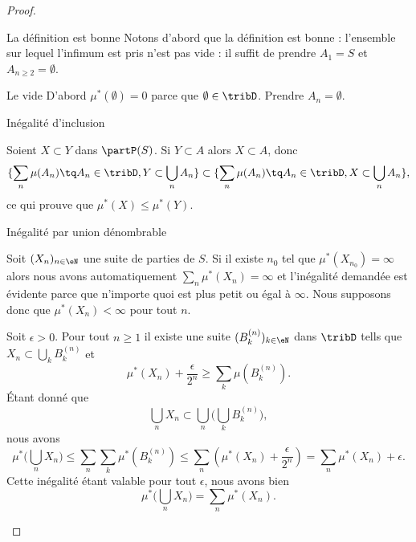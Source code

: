 \begin{proof}
    \begin{subproof}
    \item[La définition est bonne]
    Notons d'abord que la définition est bonne : l'ensemble sur lequel l'infimum est pris n'est pas vide : il suffit de prendre \( A_1=S\) et \( A_{n\geq 2}=\emptyset\).
    \item[Le vide]
        D'abord \( \mu^*(\emptyset)=0\) parce que \( \emptyset\in\tribD\). Prendre \( A_n=\emptyset\).
    \item[Inégalité d'inclusion]

        Soient \( X\subset Y\) dans \( \partP(S)\). Si \( Y\subset A\) alors \( X\subset A\), donc
        \begin{equation}
            \{ \sum_n\mu(A_n)\tq A_n\in\tribD,Y\subset\bigcup_nA_n \} \subset\{ \sum_n\mu(A_n)\tq A_n\in\tribD,X\subset\bigcup_nA_n \} ,
        \end{equation}
        ce qui prouve que \( \mu^*(X)\leq \mu^*(Y)\).
    \item[Inégalité par union dénombrable]

        Soit \( (X_n)_{n\in \eN}\) une suite de parties de \( S\). Si il existe \( n_0\) tel que \( \mu^*(X_{n_0})=\infty\) alors nous avons automatiquement \( \sum_n\mu^*(X_n)=\infty\) et l'inégalité demandée est évidente parce que n'importe quoi est plus petit ou égal à \( \infty\). Nous supposons donc que \( \mu^*(X_n)<\infty\) pour tout \( n\). 

        Soit \( \epsilon>0\). Pour tout \( n\geq 1\) il existe une suite \( (B_k^{(n)})_{k\in \eN}\) dans \( \tribD\) tells que \( X_n\subset\bigcup_kB_k^{(n)}\) et
        \begin{equation}
            \mu^*(X_n)+\frac{ \epsilon }{ 2^n }\geq \sum_k\mu(B_k^{(n)}).
        \end{equation}
        Étant donné que
        \begin{equation}
            \bigcup_nX_n\subset\bigcup_n\big( \bigcup_kB_k^{(n)} \big),
        \end{equation}
        nous avons
        \begin{equation}
            \mu^*\big( \bigcup_nX_n \big)\leq \sum_n\sum_k\mu^*(B_k^{(n)})\leq \sum_n\left( \mu^*(X_n)+\frac{ \epsilon }{ 2^n } \right)=\sum_n\mu^*(X_n)+\epsilon.
        \end{equation}
        Cette inégalité étant valable pour tout \( \epsilon\), nous avons bien
        \begin{equation}
            \mu^*\big( \bigcup_nX_n \big)=\sum_n\mu^*(X_n).
        \end{equation}


\end{subproof}
\end{proof}
